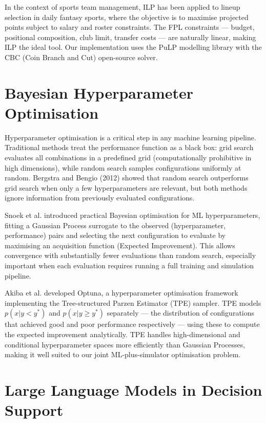In the context of sports team management, ILP has been applied to lineup selection in daily fantasy sports, where the objective is to maximise projected points subject to salary and roster constraints. The FPL constraints — budget, positional composition, club limit, transfer costs — are naturally linear, making ILP the ideal tool. Our implementation uses the PuLP modelling library \cite{mitchell2011pulp} with the CBC (Coin Branch and Cut) open-source solver.

\section{Bayesian Hyperparameter Optimisation}

Hyperparameter optimisation is a critical step in any machine learning pipeline. Traditional methods treat the performance function as a black box: grid search evaluates all combinations in a predefined grid (computationally prohibitive in high dimensions), while random search samples configurations uniformly at random. Bergstra and Bengio (2012) showed that random search outperforms grid search when only a few hyperparameters are relevant, but both methods ignore information from previously evaluated configurations.

Snoek et al. \cite{snoek2012practical} introduced practical Bayesian optimisation for ML hyperparameters, fitting a Gaussian Process surrogate to the observed (hyperparameter, performance) pairs and selecting the next configuration to evaluate by maximising an acquisition function (Expected Improvement). This allows convergence with substantially fewer evaluations than random search, especially important when each evaluation requires running a full training and simulation pipeline.

Akiba et al. \cite{akiba2019optuna} developed Optuna, a hyperparameter optimisation framework implementing the Tree-structured Parzen Estimator (TPE) sampler. TPE models $p(x|y < y^*)$ and $p(x|y \geq y^*)$ separately — the distribution of configurations that achieved good and poor performance respectively — using these to compute the expected improvement analytically. TPE handles high-dimensional and conditional hyperparameter spaces more efficiently than Gaussian Processes, making it well suited to our joint ML-plus-simulator optimisation problem.

\section{Large Language Models in Decision Support}

